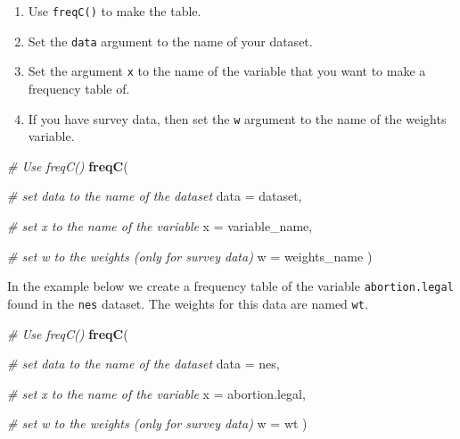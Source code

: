 \documentclass[
]{book}
\newenvironment{Shaded}{\begin{snugshade}}{\end{snugshade}}
\newcommand{\AttributeTok}[1]{\textcolor[rgb]{0.13,0.29,0.53}{#1}}
\newcommand{\CommentTok}[1]{\textcolor[rgb]{0.56,0.35,0.01}{\textit{#1}}}
\newcommand{\FunctionTok}[1]{\textcolor[rgb]{0.13,0.29,0.53}{\textbf{#1}}}
\newcommand{\NormalTok}[1]{#1}
\providecommand{\tightlist}{%
  \setlength{\itemsep}{0pt}\setlength{\parskip}{0pt}}
\begin{document}
\begin{enumerate}
\def\labelenumi{\arabic{enumi}.}
\tightlist
\item
  Use \texttt{freqC()} to make the table.
\item
  Set the \texttt{data} argument to the name of your dataset.
\item
  Set the argument \texttt{x} to the name of the variable that you want to make a frequency table of.
\item
  If you have survey data, then set the \texttt{w} argument to the name of the weights variable.
\end{enumerate}

\begin{Shaded}
\begin{Highlighting}[]
\CommentTok{\# Use \textasciigrave{}freqC()\textasciigrave{}}
\FunctionTok{freqC}\NormalTok{(}
  
  \CommentTok{\# set data to the name of the dataset}
  \AttributeTok{data =}\NormalTok{ dataset,}
  
  \CommentTok{\# set x to the name of the variable}
  \AttributeTok{x =}\NormalTok{ variable\_name,}
  
  \CommentTok{\# set w to the weights (only for survey data)}
  \AttributeTok{w =}\NormalTok{ weights\_name}
\NormalTok{)}
\end{Highlighting}
\end{Shaded}

In the example below we create a frequency table of the variable \texttt{abortion.legal} found in the \texttt{nes} dataset. The weights for this data are named \texttt{wt}.

\begin{Shaded}
\begin{Highlighting}[]
\CommentTok{\# Use \textasciigrave{}freqC()\textasciigrave{}}
\FunctionTok{freqC}\NormalTok{(}
  
  \CommentTok{\# set data to the name of the dataset}
  \AttributeTok{data =}\NormalTok{ nes,}
  
  \CommentTok{\# set x to the name of the variable}
  \AttributeTok{x =}\NormalTok{ abortion.legal,}
  
  \CommentTok{\# set w to the weights (only for survey data)}
  \AttributeTok{w =}\NormalTok{ wt}
\NormalTok{)}
\end{Highlighting}
\end{Shaded}
\end{document}
